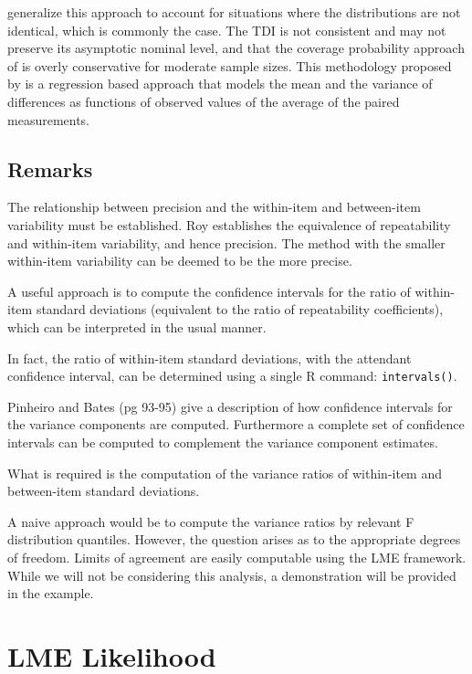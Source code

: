 \documentclass[12pt, a4paper]{report}
\theoremstyle{plain}
\theoremstyle{definition}
\theoremstyle{remark}
\begin{document}
\citet{pkcng} generalize this approach to account for situations
where the distributions are not identical, which is commonly the
case. The TDI is not consistent and may not preserve its
asymptotic nominal level, and that the coverage probability
approach of \citet{lin2002} is overly conservative for moderate
sample sizes. This methodology proposed by \citet{pkcng} is a
regression based approach that models the mean and the variance of
differences as functions of observed values of the average of the
paired measurements.

\section{Remarks}
The relationship between precision and the within-item and between-item variability must be established. Roy establishes the equivalence of repeatability and within-item variability, and hence precision.  The method with the smaller within-item variability can be deemed to be the more precise.

A useful approach is to compute the confidence intervals for the ratio of within-item standard deviations (equivalent to the ratio of repeatability coefficients), which can be interpreted in the usual manner.  

In fact, the ratio of within-item standard deviations, with the attendant confidence interval,  can be determined using a single R command: \texttt{intervals()}.

Pinheiro and Bates (pg 93-95) give a description of how confidence intervals for the variance components are computed. Furthermore a complete set of confidence intervals can be computed to complement the variance component estimates. 

What is required is the computation of the variance ratios of within-item and between-item standard deviations.  

A naive  approach would be to compute the variance ratios by relevant F distribution quantiles. However, the question arises as to the appropriate degrees of freedom.
Limits of agreement are easily computable using the LME framework. While we will not be considering this analysis, a demonstration will be provided in the example.


	\chapter{LME Likelihood}
\end{document}

